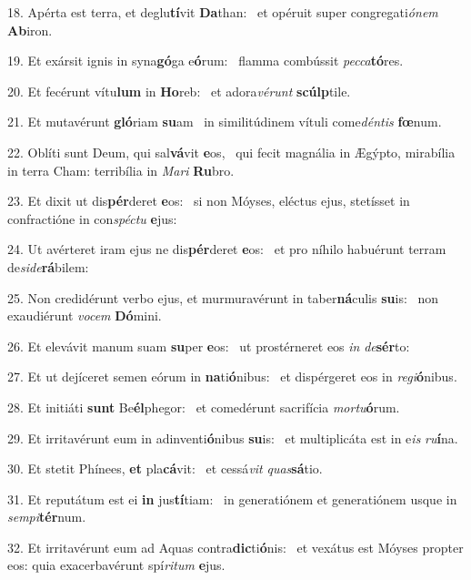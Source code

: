 18. Apérta est terra, et deglu\textbf{tí}vit \textbf{Da}than: \ast\  et opéruit super congregati\textit{ó}\textit{nem} \textbf{Ab}iron.\

19. Et exársit ignis in syna\textbf{gó}ga e\textbf{ó}rum: \ast\  flamma combússit \textit{pec}\textit{ca}\textbf{tó}res.\

20. Et fecérunt vítu\textbf{lum} in \textbf{Ho}reb: \ast\  et adora\textit{vé}\textit{runt} \textbf{scúlp}tile.\

21. Et mutavérunt \textbf{gló}riam \textbf{su}am \ast\  in similitúdinem vítuli come\textit{dén}\textit{tis} \textbf{fœ}num.\

22. Oblíti sunt Deum, qui sal\textbf{vá}vit \textbf{e}os, \ast\  qui fecit magnália in Ægýpto, mirabília in terra Cham: terribília in \textit{Ma}\textit{ri} \textbf{Ru}bro.\

23. Et dixit ut dis\textbf{pér}deret \textbf{e}os: \ast\  si non Móyses, eléctus ejus, stetísset in confractióne in con\textit{spéc}\textit{tu} \textbf{e}jus:\

24. Ut avérteret iram ejus ne dis\textbf{pér}deret \textbf{e}os: \ast\  et pro níhilo habuérunt terram de\textit{si}\textit{de}\textbf{rá}bilem:\

25. Non credidérunt verbo ejus, et murmuravérunt in taber\textbf{ná}culis \textbf{su}is: \ast\  non exaudiérunt \textit{vo}\textit{cem} \textbf{Dó}mini.\

26. Et elevávit manum suam \textbf{su}per \textbf{e}os: \ast\  ut prostérneret eos \textit{in} \textit{de}\textbf{sér}to:\

27. Et ut dejíceret semen eórum in \textbf{na}ti\textbf{ó}nibus: \ast\  et dispérgeret eos in \textit{re}\textit{gi}\textbf{ó}nibus.\

28. Et initiáti \textbf{sunt} Be\textbf{él}phegor: \ast\  et comedérunt sacrifícia \textit{mor}\textit{tu}\textbf{ó}rum.\

29. Et irritavérunt eum in adinventi\textbf{ó}nibus \textbf{su}is: \ast\  et multiplicáta est in e\textit{is} \textit{ru}\textbf{í}na.\

30. Et stetit Phínees, \textbf{et} pla\textbf{cá}vit: \ast\  et cessá\textit{vit} \textit{quas}\textbf{sá}tio.\

31. Et reputátum est ei \textbf{in} jus\textbf{tí}tiam: \ast\  in generatiónem et generatiónem usque in \textit{sem}\textit{pi}\textbf{tér}num.\

32. Et irritavérunt eum ad Aquas contra\textbf{dic}ti\textbf{ó}nis: \ast\  et vexátus est Móyses propter eos: quia exacerbavérunt spí\textit{ri}\textit{tum} \textbf{e}jus.\

